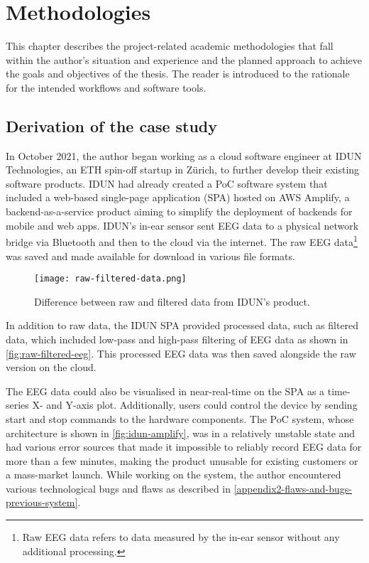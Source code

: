 \chapter{Methodologies}
\graphicspath{{Chapter3/Figs/}{Chapter3/Figs/}}

This chapter describes the project-related academic methodologies that fall within the author’s situation and experience and the planned approach to achieve the goals and objectives of the thesis. The reader is introduced to the rationale for the intended workflows and software tools.

\section{Derivation of the case study}
\label{chapter3-derivation-of-the-case-study}

In October 2021, the author began working as a cloud software engineer at IDUN Technologies, an ETH spin-off startup in Zürich, to further develop their existing software products. IDUN had already created a PoC software system that included a web-based single-page application (SPA) hosted on AWS Amplify, a backend-as-a-service product aiming to simplify the deployment of backends for mobile and web apps. IDUN’s in-ear sensor sent EEG data to a physical network bridge via Bluetooth and then to the cloud via the internet. The raw EEG data\footnote{Raw EEG data refers to data measured by the in-ear sensor without any additional processing.} was saved and made available for download in various file formats.

\begin{figure}[!ht]
  \centering
  \texttt{[image: raw-filtered-data.png]}
  \caption{Difference between raw and filtered data from IDUN’s product.}
  \label{fig:raw-filtered-eeg}
\end{figure}

In addition to raw data, the IDUN SPA provided processed data, such as filtered data, which included low-pass and high-pass filtering of EEG data as shown in \autoref{fig:raw-filtered-eeg}. This processed EEG data was then saved alongside the raw version on the cloud.

The EEG data could also be visualised in near-real-time on the SPA as a time-series X- and Y-axis plot. Additionally, users could control the device by sending start and stop commands to the hardware components. The PoC system, whose architecture is shown in \autoref{fig:idun-amplify}, was in a relatively unstable state and had various error sources that made it impossible to reliably record EEG data for more than a few minutes, making the product unusable for existing customers or a mass-market launch. While working on the system, the author encountered various technological bugs and flaws as described in \autoref{appendix2-flaws-and-bugs-previous-system}.

